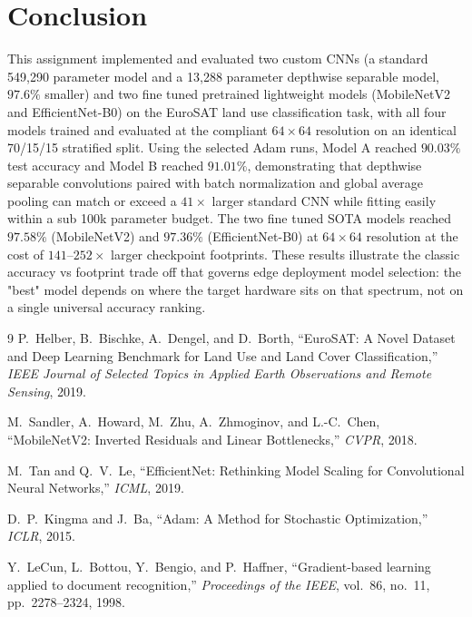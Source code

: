 \documentclass[11pt]{article}
\begin{document}
\section{Conclusion}

This assignment implemented and evaluated two custom CNNs (a standard
549{,}290 parameter model and a 13{,}288 parameter depthwise separable
model, $97.6\%$ smaller) and two fine tuned pretrained lightweight models
(MobileNetV2 and EfficientNet-B0) on the EuroSAT land use classification
task, with all four models trained and evaluated at the compliant $64\times64$
resolution on an identical 70/15/15 stratified split. Using the selected Adam
runs, Model A reached $90.03\%$ test accuracy and Model B reached $91.01\%$,
demonstrating that depthwise separable convolutions paired with batch
normalization and global average pooling can match or exceed a $41\times$ larger
standard CNN while fitting easily within a sub 100k parameter budget. The
two fine tuned SOTA models reached $97.58\%$ (MobileNetV2) and $97.36\%$
(EfficientNet-B0) at $64\times64$ resolution at the cost of $141$--$252\times$
larger checkpoint footprints. These results illustrate the classic
accuracy vs footprint trade off that governs edge deployment model
selection: the "best" model depends on where the target hardware sits on
that spectrum, not on a single universal accuracy ranking.

\begin{thebibliography}{9}
P.~Helber, B.~Bischke, A.~Dengel, and D.~Borth, ``EuroSAT: A Novel Dataset
and Deep Learning Benchmark for Land Use and Land Cover Classification,''
\emph{IEEE Journal of Selected Topics in Applied Earth Observations and
Remote Sensing}, 2019.

M.~Sandler, A.~Howard, M.~Zhu, A.~Zhmoginov, and L.-C.~Chen, ``MobileNetV2:
Inverted Residuals and Linear Bottlenecks,'' \emph{CVPR}, 2018.

M.~Tan and Q.~V.~Le, ``EfficientNet: Rethinking Model Scaling for
Convolutional Neural Networks,'' \emph{ICML}, 2019.

D.~P.~Kingma and J.~Ba, ``Adam: A Method for Stochastic Optimization,''
\emph{ICLR}, 2015.

Y.~LeCun, L.~Bottou, Y.~Bengio, and P.~Haffner, ``Gradient-based learning
applied to document recognition,'' \emph{Proceedings of the IEEE}, vol.~86,
no.~11, pp.~2278--2324, 1998.

\end{thebibliography}
\end{document}
